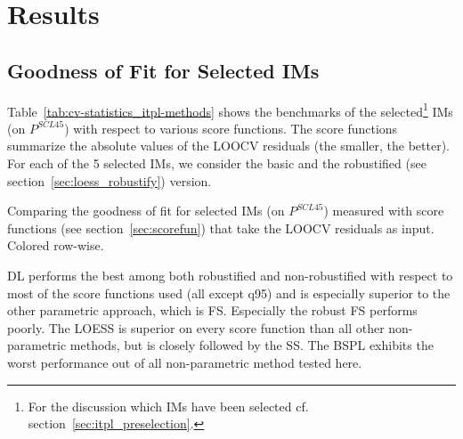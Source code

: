 \chapter{Results}\label{sec:results}

\section{Goodness of Fit for Selected {{IM}}s}{
	\label{sec:results_itpl}
	Table~\ref{tab:cv-statistics_itpl-methods} shows the benchmarks of the selected\footnote{\label{note:selected-IM} For the discussion which IMs have been selected cf. section~\ref{sec:itpl_preselection}.} {{IM}}s (on $P^{SCL45}$) with respect to various score functions. The score functions summarize the absolute values of the LOOCV residuals (the smaller, the better). For each of the 5 selected {{IM}}s, we consider the basic and the robustified (see section~\ref{sec:loess_robustify}) version.

	\begin{table}[h]
		\begin{center}
			\caption[Goodness of fit for {{IM}}s (on $P^{SCL45}$) measured with score functions.]{Comparing the goodness of fit for selected {{IM}}s (on $P^{SCL45}$) measured with score functions (see section~\ref{sec:scorefun}) that take the LOOCV residuals as input. Colored row-wise.}
			\scriptsize
			
			\normalsize
			\label{tab:cv-statistics_itpl-methods}
		\end{center}
	\end{table}
	
	DL performs the best among both robustified and non-robustified with respect to most of the score functions used (all except q95) and is especially superior to the other parametric approach, which is FS. Especially the robust FS performs poorly. The LOESS is superior on every score function than all other non-parametric methods, but is closely followed by the SS. The BSPL exhibits the worst performance out of all non-parametric method tested here. 
}


